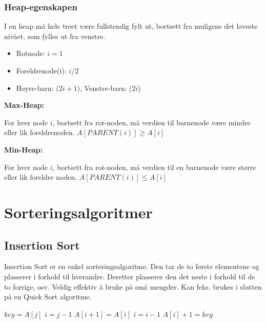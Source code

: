 \documentclass[a4paper, norsk,  10pt]{article}
\begin{document}
{{\subsubsection{Heap-egenskapen}

I en heap må hele treet være fullstendig fylt ut, bortsett fra muligens det laveste nivået, som fylles ut fra venstre.

\begin{itemize}
\item Rotnode: $i=1$ 
\item Foreldrenode(i): $i/2$ 
\item Høyre-barn: ($2i + 1$), Venstre-barn: ($2i$) 
\end{itemize}

\noindent \textbf{Max-Heap:} \\ \hfill

\noindent For hver node $i$, bortsett fra rot-noden, må verdien til barnenode være mindre eller lik foreldrenoden. $A[PARENT(i)] \geq A[i]$ \\ \hfill

\noindent \textbf{Min-Heap:} \\ \hfill

\noindent For hver node $i$, bortsett fra rot-noden, må verdien til en barnenode være større eller lik foreldre noden. $A[PARENT(i)] \leq A[i]$

\section{Sorteringsalgoritmer}

\subsection{Insertion Sort}

Insertion Sort er en enkel sorteringsalgoritme. Den tar de to første elementene og plasserer i forhold til hverandre. Deretter plasserer den det neste i forhold til de to forrige, osv. Veldig effektiv å bruke på små mengder. Kan feks. brukes i slutten på en Quick Sort algoritme. \\

\begin{algorithmic}
	\State $key = A[j]$ 
	\State $i = j - 1$ 
		\State $A[i + 1] = A[i]$ 
		\State $i = i - 1$ 
	\EndWhile
	\State $A[i] + 1 = key$ 
\EndFor
\end{algorithmic}

}}
\end{document}
